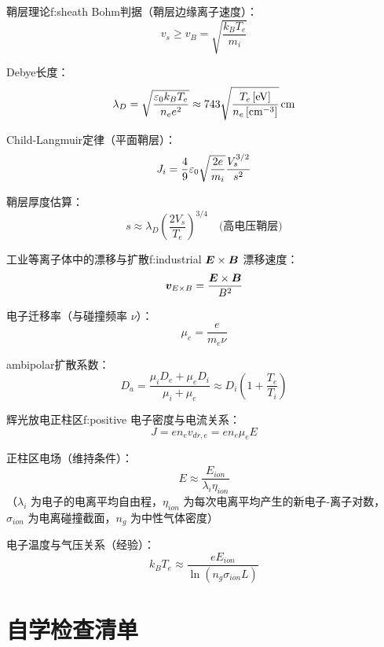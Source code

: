 \begin{formulabox}{鞘层理论}{f:sheath}
Bohm判据（鞘层边缘离子速度）：
\[
    v_s \geq v_B = \sqrt{\frac{k_B T_e}{m_i}}
\]

Debye长度：
\begin{equation}
    \lambda_D = \sqrt{\frac{\varepsilon_0 k_B T_e}{n_e e^2}} \approx 743\sqrt{\frac{T_e\,[\mathrm{eV}]}{n_e\,[\mathrm{cm^{-3}}]}}\,\mathrm{cm}
\label{eq:ch11-debye-length-ex}
\end{equation}

Child-Langmuir定律（平面鞘层）：
\begin{equation}
    J_i = \frac{4}{9}\varepsilon_0 \sqrt{\frac{2e}{m_i}} \frac{V_s^{3/2}}{s^2}
\label{eq:ch11-child-langmuir-ex}
\end{equation}

鞘层厚度估算：
\[
    s \approx \lambda_D \left(\frac{2V_s}{T_e}\right)^{3/4} \quad\text{(高电压鞘层)}
\]
\end{formulabox}

\begin{formulabox}{工业等离子体中的漂移与扩散}{f:industrial}
$\bm{E}\times\bm{B}$ 漂移速度：
\[
    \bm{v}_{E\times B} = \frac{\bm{E}\times\bm{B}}{B^2}
\]

电子迁移率（与碰撞频率 $\nu$）：
\[
    \mu_e = \frac{e}{m_e \nu}
\]

ambipolar扩散系数：
\[
    D_a = \frac{\mu_i D_e + \mu_e D_i}{\mu_i + \mu_e} \approx D_i\left(1+\frac{T_e}{T_i}\right)
\]
\end{formulabox}

\begin{formulabox}{辉光放电正柱区}{f:positive}
电子密度与电流关系：
\[
    J = e n_e v_{dr,e} = e n_e \mu_e E
\]

正柱区电场（维持条件）：
\[
    E \approx \frac{E_{ion}}{\lambda_i \eta_{ion}}
\]
（$\lambda_i$ 为电子的电离平均自由程，$\eta_{ion}$ 为每次电离平均产生的新电子-离子对数，$\sigma_{ion}$ 为电离碰撞截面，$n_g$ 为中性气体密度）

电子温度与气压关系（经验）：
\[
    k_B T_e \approx \frac{e E_{ion}}{\ln(n_g \sigma_{ion} L)}
\]
\end{formulabox}


\section{自学检查清单}

